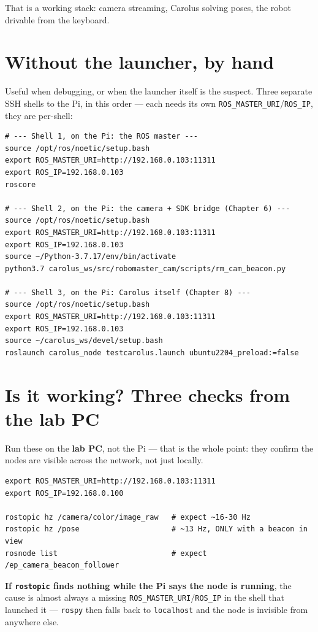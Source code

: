 \documentclass[11pt]{report}
\begin{document}
That is a working stack: camera streaming, Carolus solving poses, the robot
drivable from the keyboard.

\section{Without the launcher, by hand}

Useful when debugging, or when the launcher itself is the suspect. Three
separate SSH shells to the Pi, in this order --- each needs its own
\texttt{ROS\_MASTER\_URI}/\texttt{ROS\_IP}, they are per-shell:

\begin{lstlisting}[style=shell]
# --- Shell 1, on the Pi: the ROS master ---
source /opt/ros/noetic/setup.bash
export ROS_MASTER_URI=http://192.168.0.103:11311
export ROS_IP=192.168.0.103
roscore

# --- Shell 2, on the Pi: the camera + SDK bridge (Chapter 6) ---
source /opt/ros/noetic/setup.bash
export ROS_MASTER_URI=http://192.168.0.103:11311
export ROS_IP=192.168.0.103
source ~/Python-3.7.17/env/bin/activate
python3.7 carolus_ws/src/robomaster_cam/scripts/rm_cam_beacon.py

# --- Shell 3, on the Pi: Carolus itself (Chapter 8) ---
source /opt/ros/noetic/setup.bash
export ROS_MASTER_URI=http://192.168.0.103:11311
export ROS_IP=192.168.0.103
source ~/carolus_ws/devel/setup.bash
roslaunch carolus_node testcarolus.launch ubuntu2204_preload:=false
\end{lstlisting}

\section{Is it working? Three checks from the lab PC}

Run these on the \textbf{lab PC}, not the Pi --- that is the whole point:
they confirm the nodes are visible across the network, not just locally.

\begin{lstlisting}[style=shell]
export ROS_MASTER_URI=http://192.168.0.103:11311
export ROS_IP=192.168.0.100

rostopic hz /camera/color/image_raw   # expect ~16-30 Hz
rostopic hz /pose                     # ~13 Hz, ONLY with a beacon in view
rosnode list                          # expect /ep_camera_beacon_follower
\end{lstlisting}

\textbf{If \texttt{rostopic} finds nothing while the Pi says the node is
running}, the cause is almost always a missing
\texttt{ROS\_MASTER\_URI}/\texttt{ROS\_IP} in the shell that launched it ---
\texttt{rospy} then falls back to \texttt{localhost} and the node is
invisible from anywhere else.
\end{document}
